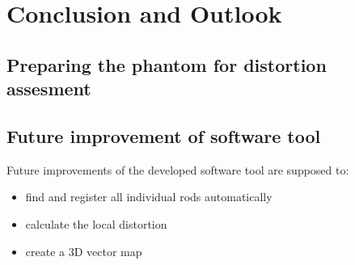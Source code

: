 
\chapter{Conclusion and Outlook}

\section{Preparing the phantom for distortion assesment}

\section{Future improvement of software tool}

Future improvements of the developed software tool are supposed to:
\begin{itemize}
 \item find and register all individual rods automatically
 \item calculate the local distortion
 \item create a 3D vector map
\end{itemize}

